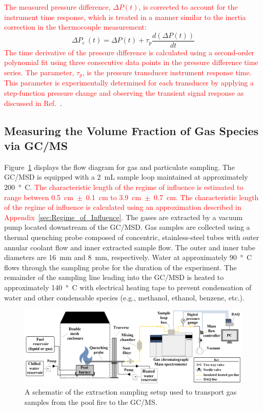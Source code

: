 \documentclass[12pt]{article}
\begin{document}
\textcolor{red}{The measured pressure difference, $\Delta P(t)$, is corrected to account for the instrument time response, which is treated in a manner similar to the inertia correction in the thermocouple measurement:}
\begin{equation}\label{eq:Delta_Pc}
\Delta P_c~(t) = \Delta P(t)+\tau_{p}\frac{d(\Delta P(t))}{dt}
\end{equation}
\textcolor{red}{The time derivative of the pressure difference is calculated using a second-order polynomial fit using three consecutive data points in the pressure difference time series. The parameter, $\tau_p$, is the pressure transducer instrument response time. This parameter is experimentally determined for each transducer by applying a step-function pressure change and observing the transient signal response as discussed in Ref.~\cite{Sung2021}}.

\subsection{Measuring the Volume Fraction of Gas Species via GC/MS}
\label{ssec:Gas_Species_Setup}

Figure~\ref{fig:Experimental_Setup} displays the flow diagram for gas and particulate sampling. The GC/MSD is equipped with a 2~mL sample loop maintained at approximately \SI{200}{\degree C}. \textcolor{red}{The characteristic length of the regime of influence is estimated to range between 0.5~cm~$\pm$~0.1~cm to 3.9~cm~$\pm$~0.7~cm. The characteristic length of the regime of influence is calculated using an approximation described in Appendix~\ref{sec:Regime_of_Influence}.} The gases are extracted by a vacuum pump located downstream of the GC/MSD. Gas samples are collected using a thermal quenching probe composed of concentric, stainless-steel tubes with outer annular coolant flow and inner extracted sample flow. The outer and inner tube diameters are \SI{16}{mm} and \SI{8}{mm}, respectively. Water at approximately \SI{90}{\degree C} flows through the sampling probe for the duration of the experiment. The remainder of the sampling line leading into the GC/MSD is heated to approximately \SI{140}{\degree C} with electrical heating tape to prevent condensation of water and other condensable species (e.g., methanol, ethanol, benzene, etc.).

\begin{figure}
	\centering
\includegraphics[width=\textwidth,keepaspectratio]{Experimental_Setup.png}
	\caption[A schematic of the gas sampling procedure]{A schematic of the extraction sampling setup used to transport gas samples from the pool fire to the GC/MS.}
	\label{fig:Experimental_Setup}
\end{figure}
\end{document}
